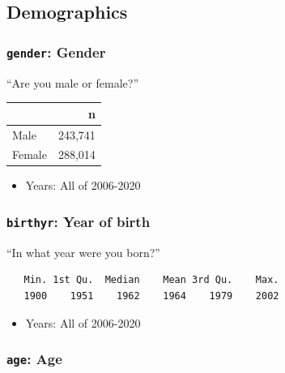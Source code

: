 \documentclass[10pt,article,oneside]{memoir}
\theoremstyle{definition}
\begin{document}
\newpage

\hypertarget{demographics}{%
\subsection{Demographics}\label{demographics}}

\hypertarget{gender-gender}{%
\subsubsection{\texorpdfstring{\texttt{gender}:
Gender}{gender: Gender}}\label{gender-gender}}

``Are you male or female?''

\begin{table}[H]
\centering
\begin{tabular}{lr}
\toprule
 & n\\
\midrule
Male & 243,741\\
Female & 288,014\\
\bottomrule
\end{tabular}
\end{table}

\begin{itemize}
\tightlist
\item
  Years: All of 2006-2020
\end{itemize}

\hypertarget{birthyr-year-of-birth}{%
\subsubsection{\texorpdfstring{\texttt{birthyr}: Year of
birth}{birthyr: Year of birth}}\label{birthyr-year-of-birth}}

``In what year were you born?''

\begin{verbatim}
   Min. 1st Qu.  Median    Mean 3rd Qu.    Max. 
   1900    1951    1962    1964    1979    2002 
\end{verbatim}

\begin{itemize}
\tightlist
\item
  Years: All of 2006-2020
\end{itemize}

\hypertarget{age-age}{%
\subsubsection{\texorpdfstring{\texttt{age}:
Age}{age: Age}}\label{age-age}}
\end{document}
